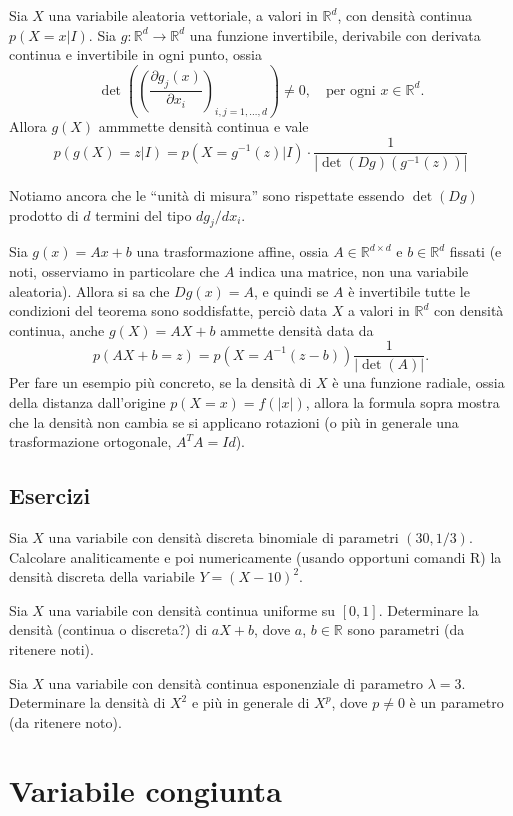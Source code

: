 \documentclass[
  italian,
  letterpaper,
]{book}
\newcommand{\bra}[1]{\left( #1 \right)}
\newcommand{\R}{\mathbb{R}}
\theoremstyle{definition}
\theoremstyle{remark}
\begin{document}
Sia \(X\) una variabile aleatoria vettoriale, a valori in \(\R^d\), con
densità continua \(p(X=x|I)\). Sia \(g: \R^d \to \R^d\) una funzione
invertibile, derivabile con derivata continua e invertibile in ogni
punto, ossia
\[ \det \bra{ \bra{\frac {\partial g_j(x)}{\partial x_i} }_{i,j=1, \ldots, d}} \neq 0, \quad \text{per ogni $x \in \R^d$.}\]
Allora \(g(X)\) ammmette densità continua e vale
\[ p(g(X) = z | I) = p( X  = g^{-1}(z) |I) \cdot\frac{1}{|\det(Dg)(g^{-1}(z))|} \]

Notiamo ancora che le ``unità di misura'' sono rispettate essendo
\(\det(Dg)\) prodotto di \(d\) termini del tipo \(dg_j/dx_i\).

Sia \(g(x ) = Ax +b\) una trasformazione affine, ossia
\(A \in \R^{d\times d}\) e \(b \in \R^d\) fissati (e noti, osserviamo in
particolare che \(A\) indica una matrice, non una variabile aleatoria).
Allora si sa che \(Dg(x)= A\), e quindi se \(A\) è invertibile tutte le
condizioni del teorema sono soddisfatte, perciò data \(X\) a valori in
\(\R^d\) con densità continua, anche \(g(X) = AX+b\) ammette densità
data da \[ p( AX +b = z ) = p( X = A^{-1}(z-b)) \frac{1}{|\det(A)|}.\]
Per fare un esempio più concreto, se la densità di \(X\) è una funzione
radiale, ossia della distanza dall'origine \(p(X = x) = f(|x|)\), allora
la formula sopra mostra che la densità non cambia se si applicano
rotazioni (o più in generale una trasformazione ortogonale,
\(A^T A = Id\)).

\subsection{Esercizi}\label{esercizi-11}

Sia \(X\) una variabile con densità discreta binomiale di parametri
\((30, 1/3)\). Calcolare analiticamente e poi numericamente (usando
opportuni comandi R) la densità discreta della variabile
\(Y = (X-10)^2\).

Sia \(X\) una variabile con densità continua uniforme su \([0,1]\).
Determinare la densità (continua o discreta?) di \(aX+b\), dove \(a\),
\(b \in \R\) sono parametri (da ritenere noti).

Sia \(X\) una variabile con densità continua esponenziale di parametro
\(\lambda= 3\). Determinare la densità di \(X^2\) e più in generale di
\(X^p\), dove \(p \neq 0\) è un parametro (da ritenere noto).

\section{Variabile congiunta}\label{sec-congiunta}
\end{document}
